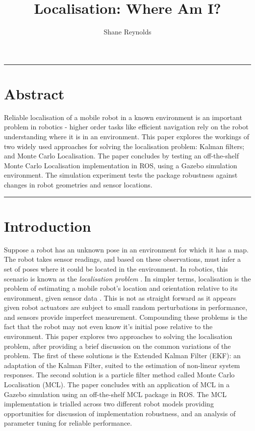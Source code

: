 \documentclass[a4paper]{article}
\begin{document}
\title{Localisation: Where Am I?}
\author{Shane Reynolds}
\maketitle

\rule{\textwidth}{1pt}
\section*{Abstract}
Reliable localisation of a mobile robot in a known environment is an important problem in robotics - higher order tasks like efficient navigation rely on the robot understanding where it is in an environment. This paper explores the workings of two widely used approaches for solving the localisation problem: Kalman filters; and Monte Carlo Localisation. The paper concludes by testing an off-the-shelf Monte Carlo Localisation implementation in ROS, using a Gazebo simulation environment. The simulation experiment tests the package robustness against changes in robot geometries and sensor locations.\\

\rule{\textwidth}{1pt}

\section{Introduction}
Suppose a robot has an unknown pose in an environment for which it has a map. The robot takes sensor readings, and based on these observations, must infer a set of poses where it could be located in the environment. In robotics, this scenario is known as the \textit{localisation problem} \cite{Cox:1991, Wang:1988}. In simpler terms, localisation is the problem of estimating a mobile robot's location and orientation relative to its environment, given sensor data \cite{Thrun:2001}. This is not as straight forward as it appears given robot actuators are subject to small random perturbations in performance, and sensors provide imperfect measurement. Compounding these problems is the fact that the robot may not even know it's initial pose relative to the environment. This paper explores two approaches to solving the localisation problem, after providing a brief discussion on the common variations of the problem. The first of these solutions is the Extended Kalman Filter (EKF): an adaptation of the Kalman Filter, suited to the estimation of non-linear system responses. The second solution is a particle filter method called Monte Carlo Localisation (MCL). The paper concludes with an application of MCL in a Gazebo simulation using an off-the-shelf MCL package in ROS. The MCL implementation is trialled across two different robot models providing opportunities for discussion of implementation robustness, and an analysis of parameter tuning for reliable performance.
\end{document}
